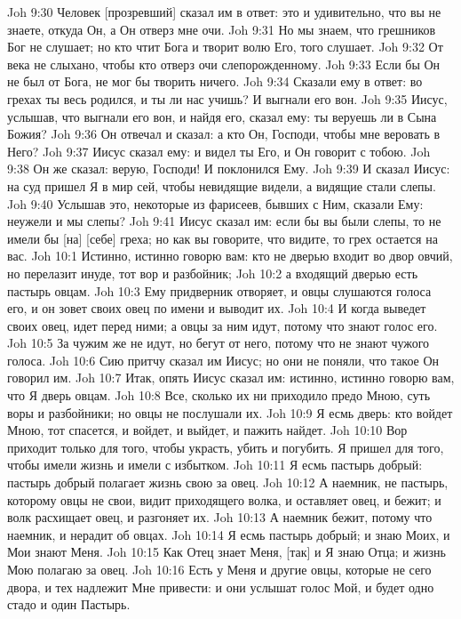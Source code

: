 Joh 9:30  Человек [прозревший] сказал им в ответ: это и удивительно, что вы не знаете, откуда Он, а Он отверз мне очи.
Joh 9:31  Но мы знаем, что грешников Бог не слушает; но кто чтит Бога и творит волю Его, того слушает.
Joh 9:32  От века не слыхано, чтобы кто отверз очи слепорожденному.
Joh 9:33  Если бы Он не был от Бога, не мог бы творить ничего.
Joh 9:34  Сказали ему в ответ: во грехах ты весь родился, и ты ли нас учишь? И выгнали его вон.
Joh 9:35  Иисус, услышав, что выгнали его вон, и найдя его, сказал ему: ты веруешь ли в Сына Божия?
Joh 9:36  Он отвечал и сказал: а кто Он, Господи, чтобы мне веровать в Него?
Joh 9:37  Иисус сказал ему: и видел ты Его, и Он говорит с тобою.
Joh 9:38  Он же сказал: верую, Господи! И поклонился Ему.
Joh 9:39  И сказал Иисус: на суд пришел Я в мир сей, чтобы невидящие видели, а видящие стали слепы.
Joh 9:40  Услышав это, некоторые из фарисеев, бывших с Ним, сказали Ему: неужели и мы слепы?
Joh 9:41  Иисус сказал им: если бы вы были слепы, то не имели бы [на] [себе] греха; но как вы говорите, что видите, то грех остается на вас.
Joh 10:1  Истинно, истинно говорю вам: кто не дверью входит во двор овчий, но перелазит инуде, тот вор и разбойник;
Joh 10:2  а входящий дверью есть пастырь овцам.
Joh 10:3  Ему придверник отворяет, и овцы слушаются голоса его, и он зовет своих овец по имени и выводит их.
Joh 10:4  И когда выведет своих овец, идет перед ними; а овцы за ним идут, потому что знают голос его.
Joh 10:5  За чужим же не идут, но бегут от него, потому что не знают чужого голоса.
Joh 10:6  Сию притчу сказал им Иисус; но они не поняли, что такое Он говорил им.
Joh 10:7  Итак, опять Иисус сказал им: истинно, истинно говорю вам, что Я дверь овцам.
Joh 10:8  Все, сколько их ни приходило предо Мною, суть воры и разбойники; но овцы не послушали их.
Joh 10:9  Я есмь дверь: кто войдет Мною, тот спасется, и войдет, и выйдет, и пажить найдет.
Joh 10:10  Вор приходит только для того, чтобы украсть, убить и погубить. Я пришел для того, чтобы имели жизнь и имели с избытком.
Joh 10:11  Я есмь пастырь добрый: пастырь добрый полагает жизнь свою за овец.
Joh 10:12  А наемник, не пастырь, которому овцы не свои, видит приходящего волка, и оставляет овец, и бежит; и волк расхищает овец, и разгоняет их.
Joh 10:13  А наемник бежит, потому что наемник, и нерадит об овцах.
Joh 10:14  Я есмь пастырь добрый; и знаю Моих, и Мои знают Меня.
Joh 10:15  Как Отец знает Меня, [так] и Я знаю Отца; и жизнь Мою полагаю за овец.
Joh 10:16  Есть у Меня и другие овцы, которые не сего двора, и тех надлежит Мне привести: и они услышат голос Мой, и будет одно стадо и один Пастырь.
